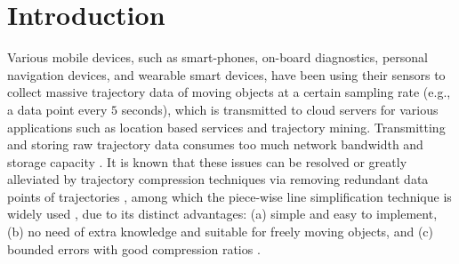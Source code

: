 \section{Introduction}
\label{sec-intro}

Various mobile devices, such as smart-phones, on-board diagnostics, personal navigation devices, and wearable smart devices, have been using their sensors to collect massive trajectory data of moving objects at a certain sampling rate (e.g., a data point every $5$ seconds), which is transmitted to cloud servers for various applications such as location based services and trajectory mining.
%
Transmitting and storing raw trajectory data consumes too much network bandwidth and storage capacity \cite{Chen:Trajectory, Meratnia:Spatiotemporal, Liu:BQS, Muckell:Compression,Cao:Spatio, Popa:Spatio,Nibali:Trajic}. %
%
%
It is known that these issues can be resolved or greatly alleviated by trajectory compression techniques via removing redundant data points of trajectories \cite{Douglas:Peucker, Hershberger:Speeding, Meratnia:Spatiotemporal, Liu:BQS, Muckell:survey, Muckell:Compression, Chen:Trajectory, Cao:Spatio, Shi:Survey, Nibali:Trajic, Long:Direction, Popa:Spatio, Song:PRESS}, among which the piece-wise line {simplification} technique is widely used \cite{Douglas:Peucker, Meratnia:Spatiotemporal, Muckell:survey, Muckell:Compression, Chen:Trajectory, Cao:Spatio, Shi:Survey, Liu:BQS, Lin:Operb}, due to its distinct advantages: (a) simple and easy to implement, (b) no need of extra knowledge and suitable for freely  moving  objects, and (c) bounded errors with good compression ratios \cite{Popa:Spatio,Lin:Operb}.

